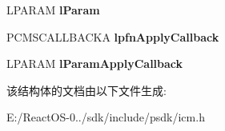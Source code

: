 \begin{DoxyCompactItemize}
L\+P\+A\+R\+AM {\bfseries l\+Param}
\item 
\mbox{\label{struct__tag_c_o_l_o_r_m_a_t_c_h_s_e_t_u_p_a_a80d540a16604554ffc2ecdd56a1b1913}} 
P\+C\+M\+S\+C\+A\+L\+L\+B\+A\+C\+KA {\bfseries lpfn\+Apply\+Callback}
\item 
\mbox{\label{struct__tag_c_o_l_o_r_m_a_t_c_h_s_e_t_u_p_a_a7878a8df38a38be9322615281e7cd949}} 
L\+P\+A\+R\+AM {\bfseries l\+Param\+Apply\+Callback}
\end{DoxyCompactItemize}


该结构体的文档由以下文件生成\+:\begin{DoxyCompactItemize}
\item 
E\+:/\+React\+O\+S-\/0../sdk/include/psdk/icm.\+h\end{DoxyCompactItemize}

